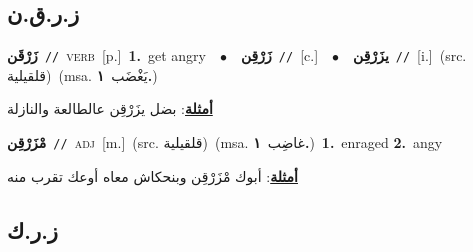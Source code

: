 \documentclass[10pt,a4paper,twoside]{article} %
\begin{document}
\begin{multicols}{2}
\vspace{-3mm}
\subsection*{\color{blue}\foreignlanguage{arabic}{ز.ر.ق.ن}\color{blue}{}} 

{\setlength\topsep{0pt}\textbf{\foreignlanguage{arabic}{زَرْقَن}}\ {\color{gray}\texttt{//}\color{black}}\ \textsc{verb}\ [p.]\ \textbf{1.}~get angry\ \ $\bullet$\ \ \setlength\topsep{0pt}\textbf{\foreignlanguage{arabic}{زَرْقِن}}\ {\color{gray}\texttt{//}\color{black}}\ [c.]\ \ $\bullet$\ \ \setlength\topsep{0pt}\textbf{\foreignlanguage{arabic}{يزَرْقِن}}\ {\color{gray}\texttt{//}\color{black}}\ [i.]\ (src. \color{gray}\foreignlanguage{arabic}{قلقيلية}\color{black})\ \color{gray}(msa. \foreignlanguage{arabic}{يَغْضَب}~\foreignlanguage{arabic}{\textbf{١.}})\color{black}\  \begin{flushright}\color{gray}\foreignlanguage{arabic}{\textbf{\underline{\foreignlanguage{arabic}{أمثلة}}}: بضل يزَرْقِن عالطالعة والنازلة}\end{flushright}\color{black}} \vspace{2mm}

{\setlength\topsep{0pt}\textbf{\foreignlanguage{arabic}{مْزَرْقِن}}\ {\color{gray}\texttt{//}\color{black}}\ \textsc{adj}\ [m.]\ (src. \color{gray}\foreignlanguage{arabic}{قلقيلية}\color{black})\ \color{gray}(msa. \foreignlanguage{arabic}{غاضِب}~\foreignlanguage{arabic}{\textbf{١.}})\color{black}\ \textbf{1.}~enraged  \textbf{2.}~angy\  \begin{flushright}\color{gray}\foreignlanguage{arabic}{\textbf{\underline{\foreignlanguage{arabic}{أمثلة}}}: أبوك مْزَرْقِن وبنحكاش معاه أوعك تقرب منه}\end{flushright}\color{black}} \vspace{2mm}

\vspace{-3mm}
\subsection*{\color{blue}\foreignlanguage{arabic}{ز.ر.ك}\color{blue}{}} 


\end{multicols}
\end{document}
